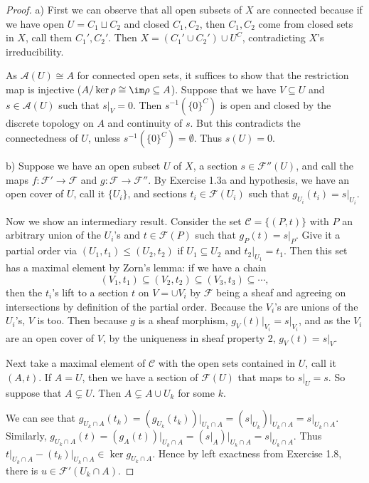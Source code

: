 \begin{proof}
	a) First we can observe that all open subsets of $X $ are connected because if we have open $U = C_{1} \sqcup C_{2} $ and closed $C_{1},C_{2} $, then $C_{1},C_{2} $ come from closed sets in $X $, call them $C_{1}',C_{2}' $.
	Then $X = (C_{1}'\cup C_{2}') \cup U^C $, contradicting $X $'s irreducibility.

	As $\mathscr{A}(U) \cong A $ for connected open sets, it suffices to show that the restriction map is injective ($A / \ker \rho \cong \im \rho \subseteq A$).
	Suppose that we have $V \subseteq U $ and $s \in \mathscr{A}(U)$ such that $s|_V = 0$.
	Then $s ^{-1}(\{0\} ^C)  $ is open and closed by the discrete topology on $A $ and continuity of $s $.
	But this contradicts the connectedness of $U $, unless $s ^{-1}(\{0\} ^C) = \emptyset  $.
	Thus $s(U) = 0 $.

	b)
	Suppose we have an open subset $U $ of $X $, a section $s \in \mathscr{F}''(U) $, and call the maps $f: \mathscr{F}' \to \mathscr{F} $ and $g: \mathscr{F}\to \mathscr{F}'' $.
	By Exercise 1.3a and hypothesis, we have an open cover of $U$, call it $\{U_i\}   $, and sections $t_i \in \mathscr{F}(U_i)$ such that $g_{U_i}(t_i) = s\big|_{U_i}$.

	Now we show an intermediary result.
	Consider the set $\mathscr{C} = \{(P,t)\}   $ with $P $ an arbitrary union of the $U_i $'s and $t \in \mathscr{F}(P) $ such that $g_P(t) = s|_P $.
	Give it a partial order via $(U_{1},t_{1}) \le (U_{2},t_{2}) $ if $U_{1}\subseteq U_{2} $ and $t_{2}\big|_{U_{1}} = t_{1} $.
	Then this set has a maximal element by Zorn's lemma:
	if we have a chain
	\[
		(V_{1},t_{1}) \subseteq (V_{2},t_{2}) \subseteq (V_{3},t_{3}) \subseteq \cdots
	,\]
	then the $t_i $'s lift to a section $t $ on $V = \cup V_i $ by $\mathscr{F} $ being a sheaf and agreeing on intersections by definition of the partial order.
	Because the $V_i $'s are unions of the $U_i $'s, $V $ is too.
	Then because $g $ is a sheaf morphism, $g_V(t)\big|_{V_i} = s\big|_{V_i} $, and as the $V_i $ are an open cover of $V $, by the uniqueness in sheaf property 2, $g_V(t) = s\big|_{V} $.

	Next take a maximal element of $\mathscr{C} $ with the open sets contained in $U $, call it $(A,t) $.
	If $A = U $, then we have a section of $\mathscr{F}(U) $ that maps to $s|_U = s $.
	So suppose that $A \subsetneq U $.
	Then $A \subsetneq A \cup U_k $ for some $k $.

	We can see that $g_{U_k\cap A}(t_k) = (g_{U_k}(t_k))\big|_{U_k\cap A} = (s\big|_{U_k})\big|_{U_k\cap A} = s\big|_{U_k\cap A}$.
	Similarly, $g_{U_k\cap A}(t) = (g_{A}(t))\big|_{U_k\cap A} = (s\big|_{A})\big|_{U_k\cap A} = s\big|_{U_k\cap A} $.
	Thus $t\big|_{U_k\cap A}-(t_k)\big|_{U_k\cap A} \in \ker g_{U_k\cap A} $.
	Hence by left exactness from Exercise 1.8, there is $u\in \mathscr{F}'(U_k\cap A) $.


\end{proof}
